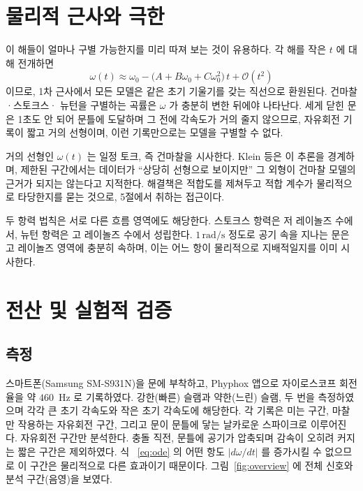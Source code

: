 \documentclass[11pt,letterpaper]{article}
\begin{document}
\section{물리적 근사와 극한}
이 해들이 얼마나 구별 가능한지를 미리 따져 보는 것이 유용하다. 각 해를 작은 $t$ 에 대해
전개하면
\begin{equation}
\omega(t)\approx\omega_0-\bigl(A+B\omega_0+C\omega_0^2\bigr)\,t+\mathcal{O}(t^2)
\end{equation}
이므로, 1차 근사에서 모든 모델은 같은 초기 기울기를 갖는 직선으로 환원된다. 건마찰·스토크스·
뉴턴을 구별하는 곡률은 $\omega$ 가 충분히 변한 뒤에야 나타난다. 세게 닫힌 문은 1초도 안 되어
문틀에 도달하며 그 전에 각속도가 거의 줄지 않으므로, 자유회전 기록이 짧고 거의 선형이며,
이런 기록만으로는 모델을 구별할 수 없다.

\begin{physicsinsight}
거의 선형인 $\omega(t)$ 는 일정 토크, 즉 건마찰을 시사한다. Klein 등은 이 추론을
경계하며, 제한된 구간에서는 데이터가 ``상당히 선형으로 보이지만'' 그 외형이 건마찰
모델의 근거가 되지는 않는다고 지적한다. 해결책은 적합도를 제쳐두고 적합 계수가 물리적으로
타당한지를 묻는 것으로, 5절에서 취하는 접근이다.
\end{physicsinsight}

두 항력 법칙은 서로 다른 흐름 영역에도 해당한다. 스토크스 항력은 저 레이놀즈 수에서,
뉴턴 항력은 고 레이놀즈 수에서 성립한다. $1\,\mathrm{rad/s}$ 정도로 공기 속을 지나는 문은
고 레이놀즈 영역에 충분히 속하며, 이는 어느 항이 물리적으로 지배적일지를 이미 시사한다.

\section{전산 및 실험적 검증}
\subsection{측정}
스마트폰(Samsung SM-S931N)을 문에 부착하고, Phyphox 앱으로 자이로스코프 회전율을 약
$460$~Hz 로 기록하였다. 강한(빠른) 슬램과 약한(느린) 슬램, 두 번을 측정하였으며 각각 큰
초기 각속도와 작은 초기 각속도에 해당한다. 각 기록은 미는 구간, 마찰만 작용하는 자유회전
구간, 그리고 문이 문틀에 닿는 날카로운 스파이크로 이루어진다. 자유회전 구간만 분석한다.
충돌 직전, 문틀에 공기가 압축되며 감속이 오히려 커지는 짧은 구간은 제외하였다. 식~
\eqref{eq:ode} 의 어떤 항도 $|d\omega/dt|$ 를 증가시킬 수 없으므로 이 구간은 물리적으로
다른 효과이기 때문이다. 그림~\ref{fig:overview} 에 전체 신호와 분석 구간(음영)을 보였다.
\end{document}

